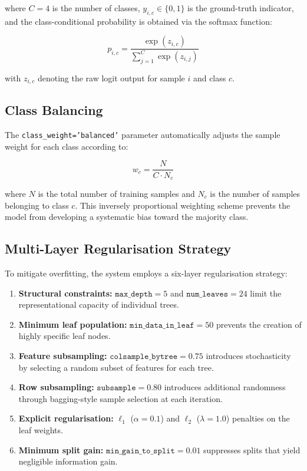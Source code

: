 \documentclass[a4paper,12pt]{article}
\begin{document}
\noindent where $C = 4$ is the number of classes, $y_{i,c} \in \{0, 1\}$ is the ground-truth indicator, and the class-conditional probability is obtained via the softmax function:

\begin{equation}
p_{i,c} = \frac{\exp(z_{i,c})}{\sum_{j=1}^{C} \exp(z_{i,j})}
\label{eq:softmax}
\end{equation}

\noindent with $z_{i,c}$ denoting the raw logit output for sample $i$ and class $c$.

\subsection{Class Balancing}

The \texttt{class\_weight='balanced'} parameter automatically adjusts the sample weight for each class according to:

\begin{equation}
w_c = \frac{N}{C \cdot N_c}
\label{eq:balance}
\end{equation}

\noindent where $N$ is the total number of training samples and $N_c$ is the number of samples belonging to class $c$. This inversely proportional weighting scheme prevents the model from developing a systematic bias toward the majority class.

\subsection{Multi-Layer Regularisation Strategy}

To mitigate overfitting, the system employs a six-layer regularisation strategy:

\begin{enumerate}
    \item \textbf{Structural constraints:} $\texttt{max\_depth} = 5$ and $\texttt{num\_leaves} = 24$ limit the representational capacity of individual trees.
    \item \textbf{Minimum leaf population:} $\texttt{min\_data\_in\_leaf} = 50$ prevents the creation of highly specific leaf nodes.
    \item \textbf{Feature subsampling:} $\texttt{colsample\_bytree} = 0.75$ introduces stochasticity by selecting a random subset of features for each tree.
    \item \textbf{Row subsampling:} $\texttt{subsample} = 0.80$ introduces additional randomness through bagging-style sample selection at each iteration.
    \item \textbf{Explicit regularisation:} $\ell_1$ ($\alpha = 0.1$) and $\ell_2$ ($\lambda = 1.0$) penalties on the leaf weights.
    \item \textbf{Minimum split gain:} $\texttt{min\_gain\_to\_split} = 0.01$ suppresses splits that yield negligible information gain.
\end{enumerate}
\end{document}
